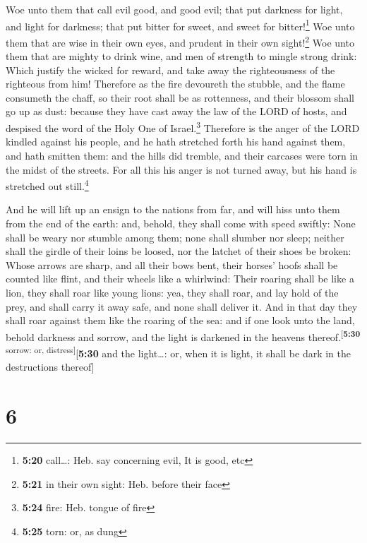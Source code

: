  Woe unto them that call evil good, and good evil; that
put darkness for light, and light for darkness; that put bitter for
sweet, and sweet for bitter!\footnote{\textbf{5:20} call\ldots: Heb. say
  concerning evil, It is good, etc}  Woe unto them that
are wise in their own eyes, and prudent in their own sight!\footnote{\textbf{5:21}
  in their own sight: Heb. before their face}  Woe unto
them that are mighty to drink wine, and men of strength to mingle strong
drink:  Which justify the wicked for reward, and take
away the righteousness of the righteous from him! 
Therefore as the fire devoureth the stubble, and the flame consumeth the
chaff, so their root shall be as rottenness, and their blossom shall go
up as dust: because they have cast away the law of the LORD of hosts,
and despised the word of the Holy One of Israel.\footnote{\textbf{5:24}
  fire: Heb. tongue of fire}  Therefore is the anger of
the LORD kindled against his people, and he hath stretched forth his
hand against them, and hath smitten them: and the hills did tremble, and
their carcases were torn in the midst of the streets. For all this his
anger is not turned away, but his hand is stretched out
still.\footnote{\textbf{5:25} torn: or, as dung}

 And he will lift up an ensign to the nations from far,
and will hiss unto them from the end of the earth: and, behold, they
shall come with speed swiftly:  None shall be weary nor
stumble among them; none shall slumber nor sleep; neither shall the
girdle of their loins be loosed, nor the latchet of their shoes be
broken:  Whose arrows are sharp, and all their bows bent,
their horses' hoofs shall be counted like flint, and their wheels like a
whirlwind:  Their roaring shall be like a lion, they
shall roar like young lions: yea, they shall roar, and lay hold of the
prey, and shall carry it away safe, and none shall deliver it.
 And in that day they shall roar against them like the
roaring of the sea: and if one look unto the land, behold darkness and
sorrow, and the light is darkened in the heavens
thereof.\textsuperscript{{[}\textbf{5:30} sorrow: or,
distress{]}}{[}\textbf{5:30} and the light\ldots: or, when it is light,
it shall be dark in the destructions thereof{]}

\hypertarget{section-5}{%
\section{6}\label{section-5}}

